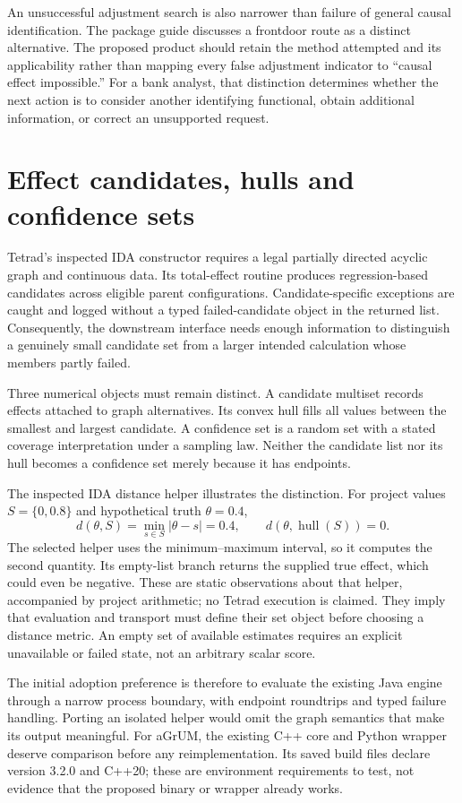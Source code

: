 An unsuccessful adjustment search is also narrower than failure of general
causal identification. The package guide discusses a frontdoor route as a
distinct alternative. The proposed product should retain the method attempted
and its applicability rather than mapping every false adjustment indicator to
``causal effect impossible.'' For a bank analyst, that distinction determines
whether the next action is to consider another identifying functional, obtain
additional information, or correct an unsupported request.

\section{Effect candidates, hulls and confidence sets}

Tetrad's inspected IDA constructor requires a legal partially directed acyclic
graph and continuous data. Its total-effect routine produces regression-based
candidates across eligible parent configurations. Candidate-specific exceptions
are caught and logged without a typed failed-candidate object in the returned
list. Consequently, the downstream interface needs enough information to
distinguish a genuinely small candidate set from a larger intended calculation
whose members partly failed.\cite{v12_sw_tetrad}

Three numerical objects must remain distinct. A candidate multiset records
effects attached to graph alternatives. Its convex hull fills all values
between the smallest and largest candidate. A confidence set is a random set
with a stated coverage interpretation under a sampling law. Neither the
candidate list nor its hull becomes a confidence set merely because it has
endpoints.

The inspected IDA distance helper illustrates the distinction. For project
values \(S=\{0,0.8\}\) and hypothetical truth \(\theta=0.4\),
\[
 d(\theta,S)=\min_{s\in S}|\theta-s|=0.4,
 \qquad d(\theta,\operatorname{hull}(S))=0.
\]
The selected helper uses the minimum--maximum interval, so it computes the
second quantity. Its empty-list branch returns the supplied true effect, which
could even be negative. These are static observations about that helper,
accompanied by project arithmetic; no Tetrad execution is claimed. They imply
that evaluation and transport must define their set object before choosing a
distance metric. An empty set of available estimates requires an explicit
unavailable or failed state, not an arbitrary scalar score.\cite{v12_sw_tetrad}

The initial adoption preference is therefore to evaluate the existing Java
engine through a narrow process boundary, with endpoint roundtrips and typed
failure handling. Porting an isolated helper would omit the graph semantics
that make its output meaningful. For aGrUM, the existing C++ core and Python
wrapper deserve comparison before any reimplementation. Its saved build files
declare version 3.2.0 and C++20; these are environment requirements to test,
not evidence that the proposed binary or wrapper already works.

